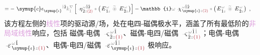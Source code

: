 \begin{subequations}
\begin{align}
	= -~ {\symup{c}} \epsilon^{\hphantom{\symup{\iota}}\mathcolor{gray}{\dot{1}}\dot{2}}_{\symup{\iota}} \mathcolor{gray}{k^\nabla_{\dot{1}}} \left[ \Xint{\begin{smallmatrix} ~ \\ {}^{}_{\mathcolor{gray}{-}} \\ ~ \end{smallmatrix}}{17}{\eta}^{\;\! \mathcolor{gray}{\omega} \hat{1} \hat{2}}_{\;\! \dot{2} \mathcolor{gray}{z} \textcolor{Maroon}{(2)}} \mathcolor{gray}{*} \left( \Xint{\mathcolor{gray}{-}}{295}{E}^{\;\!\mathcolor{gray}{\omega}}_{\;\! \hat{1} \mathcolor{gray}{z}} ~\mathcolor{gray}{\widetilde \circledast}~ \Xint{\mathcolor{gray}{-}}{295}{E}^{\;\!\mathcolor{gray}{\omega}}_{\;\! \hat{2} \mathcolor{gray}{z}} \right) \right] &- \mathbb{i} \mathcolor{gray}{\omega} ~\Xint{{}^{}_{\mathcolor{gray}{-}}}{23}{\chi}^{\;\! \mathcolor{gray}{\omega} \hat{1} \hat{2}}_{\;\! \symup{\iota} \mathcolor{gray}{z} \textcolor{Maroon}{(2)}} \mathcolor{gray}{*} \left( \Xint{\mathcolor{gray}{-}}{295}{E}^{\;\!\mathcolor{gray}{\omega}}_{\;\! \hat{1} \mathcolor{gray}{z}} ~\mathcolor{gray}{\widetilde \circledast}~ \Xint{\mathcolor{gray}{-}}{295}{E}^{\;\!\mathcolor{gray}{\omega}}_{\;\! \hat{2} \mathcolor{gray}{z}} \right)~,
\end{align}
\end{subequations}
该方程左侧的\textcolor{Plum}{线性}项的\textcolor{NavyBlue}{驱动源}/场，处在\textcolor{NavyBlue}{电四-磁偶}极水平，涵盖了所有最低阶的\textcolor{Plum}{非局域}\textcolor{Plum}{线性}响应，包括 \textcolor{NavyBlue}{磁偶-电偶} $\Xint{\begin{smallmatrix} ~ \\ {}^{}_{\mathcolor{gray}{-}} \\ ~ \end{smallmatrix}}{13}{\varsigma}^{\;\! \mathcolor{gray}{\omega} \hat{1}}_{\;\! \dot{2} \mathcolor{gray}{z} \textcolor{Maroon}{(1)}}$、\textcolor{NavyBlue}{磁偶-电四/磁偶} $\Xint{\begin{smallmatrix} ~ \\ {}^{}_{\mathcolor{gray}{-}} \\ ~ \end{smallmatrix}}{13}{\varsigma}^{\;\! \mathcolor{gray}{\omega} \hat{1} \mathcolor{gray}{\check{1}}}_{\;\! \dot{2} \mathcolor{gray}{z} \textcolor{Maroon}{(1)}}$；\textcolor{NavyBlue}{电偶-电偶} $\Xint{\begin{smallmatrix} ~ \\ {}^{}_{\mathcolor{gray}{-}} \\ ~ \end{smallmatrix}}{16}{\varepsilon}^{\;\! \mathcolor{gray}{\omega} \hat{1}}_{\;\! \symup{\iota} \mathcolor{gray}{z} \textcolor{Maroon}{(1)}}$、\textcolor{NavyBlue}{电偶-电四/磁偶} $\Xint{\begin{smallmatrix} ~ \\ {}^{}_{\mathcolor{gray}{-}} \\ ~ \end{smallmatrix}}{16}{\varepsilon}^{\;\! \mathcolor{gray}{\omega} \hat{1} \mathcolor{gray}{\check{1}}}_{\;\! \symup{\iota} \mathcolor{gray}{z} \textcolor{Maroon}{(1)}}$ 极响应。

